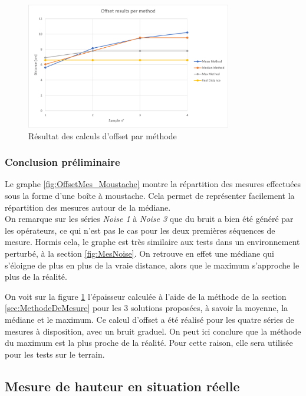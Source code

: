 \begin{figure}[H]
    \centering
    \includegraphics[width=0.8\textwidth]{Images/LiDAR/LiDAR_OffsetMes_PerMethods.png}
    \caption{Résultat des calculs d'offset par méthode}
    \label{fig:OffsetMes_PerMethod}
\end{figure}

\subsubsection{Conclusion préliminaire} 

Le graphe \ref{fig:OffsetMes_Moustache} montre la répartition des mesures effectuées sous la forme d'une
boîte à moustache. Cela permet de représenter facilement la répartition des mesures autour de la médiane.\\
On remarque sur les séries \emph{Noise 1} à \emph{Noise 3} que du bruit a bien été généré par les
opérateurs, ce qui n'est pas le cas pour les deux premières séquences de mesure. Hormis cela, le graphe
est très similaire aux tests dans un environnement perturbé, à la section \ref{fig:MesNoise}. On retrouve
en effet une médiane qui s'éloigne de plus en plus de la vraie distance, alors que le maximum s'approche
le plus de la réalité.\par
On voit sur la figure \ref{fig:OffsetMes_PerMethod} l'épaisseur calculée à l'aide de la méthode de la section
\ref{sec:MethodeDeMesure} pour les 3 solutions proposées, à savoir la moyenne, la médiane et le maximum. Ce
calcul d'offset a été réalisé pour les quatre séries de mesures à disposition, avec un bruit graduel. On 
peut ici conclure que la méthode du maximum est la plus proche de la réalité. Pour cette raison, elle sera
utilisée pour les tests sur le terrain.

\subsection{Mesure de hauteur en situation réelle}

